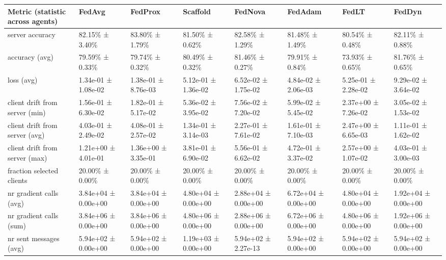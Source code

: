 \begin{tabular}{llllllll}
\hline
 Metric (statistic across agents)   & FedAvg              & FedProx             & Scaffold            & FedNova             & FedAdam             & FedLT               & FedDyn              \\
\hline
 server accuracy                    & 82.15\% ± 3.40\%      & 83.80\% ± 1.79\%      & 81.50\% ± 0.62\%      & 82.58\% ± 1.29\%      & 81.48\% ± 1.49\%      & 80.54\% ± 0.48\%      & 82.11\% ± 0.88\%      \\
 accuracy (avg)                     & 79.59\% ± 0.33\%      & 79.74\% ± 0.32\%      & 80.49\% ± 0.32\%      & 81.46\% ± 0.27\%      & 79.91\% ± 0.84\%      & 73.93\% ± 0.65\%      & 81.76\% ± 0.65\%      \\
 loss (avg)                         & 1.34e-01 ± 1.08e-02 & 1.38e-01 ± 8.76e-03 & 5.12e-01 ± 1.36e-02 & 6.52e-02 ± 1.75e-02 & 4.84e-02 ± 2.06e-03 & 5.25e-01 ± 2.28e-02 & 9.29e-02 ± 3.64e-02 \\
 client drift from server (min)     & 1.56e-01 ± 6.30e-02 & 1.82e-01 ± 5.17e-02 & 5.36e-02 ± 3.95e-02 & 7.56e-02 ± 7.20e-02 & 5.99e-02 ± 5.45e-02 & 2.37e+00 ± 7.26e-02 & 3.05e-02 ± 1.53e-02 \\
 client drift from server (avg)     & 4.03e-01 ± 2.49e-02 & 4.08e-01 ± 2.57e-02 & 1.34e-01 ± 3.14e-03 & 2.27e-01 ± 7.61e-02 & 1.61e-01 ± 7.10e-03 & 2.47e+00 ± 6.65e-03 & 1.11e-01 ± 1.62e-02 \\
 client drift from server (max)     & 1.21e+00 ± 4.01e-01 & 1.36e+00 ± 3.35e-01 & 3.81e-01 ± 6.90e-02 & 5.56e-01 ± 6.62e-02 & 4.72e-01 ± 3.37e-02 & 2.57e+00 ± 1.07e-02 & 4.03e-01 ± 3.00e-03 \\
 fraction selected clients          & 20.00\% ± 0.00\%      & 20.00\% ± 0.00\%      & 20.00\% ± 0.00\%      & 20.00\% ± 0.00\%      & 20.00\% ± 0.00\%      & 20.00\% ± 0.00\%      & 20.00\% ± 0.00\%      \\
 nr gradient calls (avg)            & 3.84e+04 ± 0.00e+00 & 3.84e+04 ± 0.00e+00 & 4.80e+04 ± 0.00e+00 & 2.88e+04 ± 0.00e+00 & 6.72e+04 ± 0.00e+00 & 4.80e+04 ± 0.00e+00 & 1.92e+04 ± 0.00e+00 \\
 nr gradient calls (sum)            & 3.84e+06 ± 0.00e+00 & 3.84e+06 ± 0.00e+00 & 4.80e+06 ± 0.00e+00 & 2.88e+06 ± 0.00e+00 & 6.72e+06 ± 0.00e+00 & 4.80e+06 ± 0.00e+00 & 1.92e+06 ± 0.00e+00 \\
 nr sent messages (avg)             & 5.94e+02 ± 0.00e+00 & 5.94e+02 ± 0.00e+00 & 1.19e+03 ± 0.00e+00 & 5.94e+02 ± 2.27e-13 & 5.94e+02 ± 0.00e+00 & 5.94e+02 ± 0.00e+00 & 5.94e+02 ± 0.00e+00 \\

\end{tabular}
